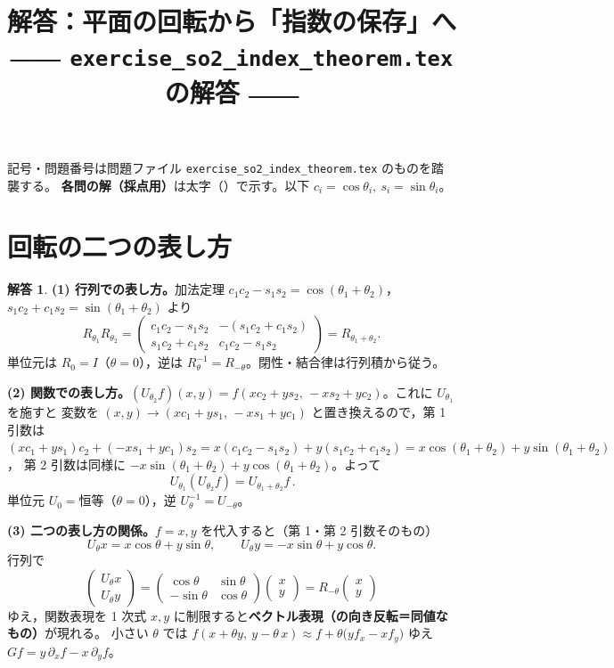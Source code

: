 \documentclass[dvipdfmx, uplatex]{jsarticle}
\title{解答：平面の回転から「指数の保存」へ\\
\large ―― \texttt{exercise\_so2\_index\_theorem.tex} の解答 ――}
\author{}
\date{}
\theoremstyle{definition}
\newtheorem*{sol}{解答}
\begin{document}
\maketitle
\vspace{-6zh}

記号・問題番号は問題ファイル \texttt{exercise\_so2\_index\_theorem.tex} のものを踏襲する。
\textbf{各問の解（採点用）}は太字（\boxed）で示す。以下 $c_i=\cos\theta_i,\ s_i=\sin\theta_i$。

\section{回転の二つの表し方}
\begin{sol}
\textbf{(1) 行列での表し方。}加法定理 $c_1c_2-s_1s_2=\cos(\theta_1{+}\theta_2)$，
$s_1c_2+c_1s_2=\sin(\theta_1{+}\theta_2)$ より
\[
    R_{\theta_1}R_{\theta_2}=\begin{pmatrix}c_1c_2-s_1s_2 & -(s_1c_2+c_1s_2)\\ s_1c_2+c_1s_2 & c_1c_2-s_1s_2\end{pmatrix}
    =\boxed{R_{\theta_1+\theta_2}}.
\]
単位元は $\boxed{R_0=I}$（$\theta=0$），逆は $\boxed{R_\theta^{-1}=R_{-\theta}}$。閉性・結合律は行列積から従う。

\par\smallskip
\textbf{(2) 関数での表し方。}$(U_{\theta_2}f)(x,y)=f(xc_2+ys_2,\,-xs_2+yc_2)$。これに $U_{\theta_1}$ を施すと
変数を $(x,y)\to(xc_1+ys_1,\,-xs_1+yc_1)$ と置き換えるので，第 1 引数は
$(xc_1+ys_1)c_2+(-xs_1+yc_1)s_2=x(c_1c_2-s_1s_2)+y(s_1c_2+c_1s_2)=x\cos(\theta_1{+}\theta_2)+y\sin(\theta_1{+}\theta_2)$，
第 2 引数は同様に $-x\sin(\theta_1{+}\theta_2)+y\cos(\theta_1{+}\theta_2)$。よって
\[
    \boxed{\,U_{\theta_1}(U_{\theta_2}f)=U_{\theta_1+\theta_2}f\,}.
\]
単位元 $\boxed{U_0=\text{恒等}}$（$\theta=0$），逆 $\boxed{U_\theta^{-1}=U_{-\theta}}$。

\par\smallskip
\textbf{(3) 二つの表し方の関係。}$f=x,y$ を代入すると（第 1・第 2 引数そのもの）
\[
    \boxed{U_\theta x=x\cos\theta+y\sin\theta},\qquad \boxed{U_\theta y=-x\sin\theta+y\cos\theta}.
\]
行列で
\[
    \begin{pmatrix}U_\theta x\\ U_\theta y\end{pmatrix}
    =\begin{pmatrix}\cos\theta & \sin\theta\\ -\sin\theta&\cos\theta\end{pmatrix}\begin{pmatrix}x\\ y\end{pmatrix}
    =\boxed{R_{-\theta}}\begin{pmatrix}x\\ y\end{pmatrix}
\]
ゆえ，関数表現を 1 次式 $x,y$ に制限すると\textbf{ベクトル表現（の向き反転＝同値なもの）}が現れる。
小さい $\theta$ では $f(x+\theta y,\ y-\theta\,x)\approx f+\theta\bigl(y f_x-x f_y\bigr)$ ゆえ
$\boxed{Gf=y\,\partial_x f-x\,\partial_y f}$。
\end{sol}
\end{document}
